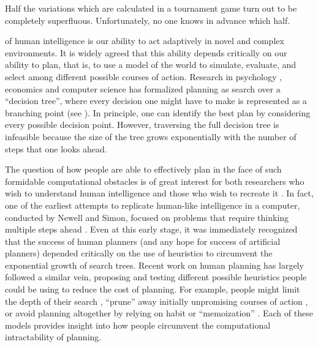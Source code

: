 \begin{savequote}[75mm]
Half the variations which are calculated in a tournament game turn out to be completely superfluous. Unfortunately, no one knows in advance which half.
\end{savequote}

\label{sec:planning}


 of human intelligence is our ability to act adaptively in novel and complex environments. It is widely agreed that this ability depends critically on our ability to plan, that is, to use a model of the world to simulate, evaluate, and select among different possible courses of action. Research in psychology \citep{huys2015interplay,huys2012bonsai,vanopheusden2017computational,macgregor2001information,keramati2016adaptive,krusche2018adaptive,snider2015prospective}, economics \citep{vonneumann1944theory,stahl1994experimental,camerer2004cognitive} and computer science \citep{newell1956logic} has formalized planning as search over a ``decision tree'', where every decision one might have to make is represented as a branching point (see ). In principle, one can identify the best plan by considering every possible decision point. However, traversing the full decision tree is infeasible because the size of the tree grows exponentially with the number of steps that one looks ahead.

The question of how people are able to effectively plan in the face of such formidable computational obstacles is of great interest for both researchers who wish to understand human intelligence and those who wish to recreate it \citep{griffiths2019doing}. In fact, one of the earliest attempts to replicate human-like intelligence in a computer, conducted by Newell and Simon, focused on problems that require thinking multiple steps ahead \citep{newell1956logic,newell1959report,newell1972human}. Even at this early stage, it was immediately recognized that the success of human planners (and any hope for success of artificial planners) depended critically on the use of heuristics to circumvent the exponential growth of search trees. Recent work on human planning has largely followed a similar vein, proposing and testing different possible heuristics people could be using to reduce the cost of planning. For example, people might limit the depth of their search \citep{macgregor2001information,keramati2016adaptive,krusche2018adaptive,snider2015prospective}, ``prune'' away initially unpromising courses of action \citep{huys2012bonsai,huys2015interplay}, or avoid planning altogether by relying on habit or ``memoization'' \citep{huys2015interplay,kool2017costbenefit}. Each of these models provides insight into how people circumvent the computational intractability of planning. 

